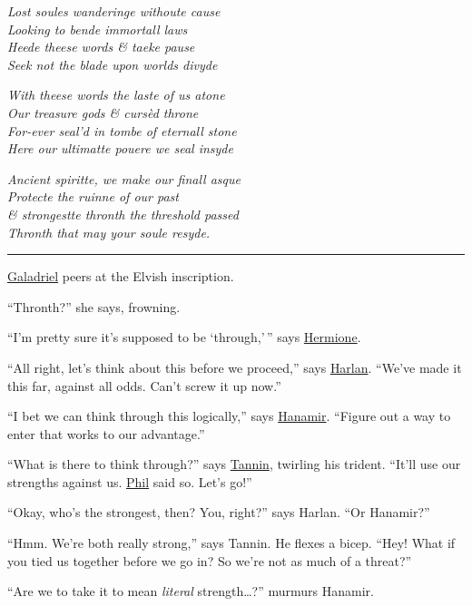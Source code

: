\documentclass[smalldemyvopaper,11pt,twoside,onecolumn,openright,extrafontsizes]{memoir}
\begin{document}
\emph{Lost soules wanderinge withoute cause}\\
\emph{Looking to bende immortall laws}\\
\emph{Heede theese words \& taeke pause}\\
\emph{Seek not the blade upon worlds divyde}

\emph{With theese words the laste of us atone}\\
\emph{Our treasure gods \& cursèd throne}\\
\emph{For-ever seal'd in tombe of eternall stone}\\
\emph{Here our ultimatte pouere we seal insyde}

\emph{Ancient spiritte, we make our finall asque}\\
\emph{Protecte the ruinne of our past}\\
\emph{\& strongestte thronth the threshold passed}\\
\emph{Thronth that may your soule resyde.}

\begin{center}\rule{0.5\linewidth}{\linethickness}\end{center}

\href{/characters/galadriel/}{Galadriel} peers at the Elvish
inscription.

``Thronth?'' she says, frowning.

``I'm pretty sure it's supposed to be `through,'\,'' says
\href{/characters/hermione/}{Hermione}.

``All right, let's think about this before we proceed,'' says
\href{/characters/harlan/}{Harlan}. ``We've made it this far, against
all odds. Can't screw it up now.''

``I bet we can think through this logically,'' says
\href{/characters/hanamir/}{Hanamir}. ``Figure out a way to enter that
works to our advantage.''

``What is there to think through?'' says
\href{/characters/tannin/}{Tannin}, twirling his trident. ``It'll use
our strengths against us. \href{/characters/phil/}{Phil} said so. Let's
go!''

``Okay, who's the strongest, then? You, right?'' says Harlan. ``Or
Hanamir?''

``Hmm. We're both really strong,'' says Tannin. He flexes a bicep.
``Hey! What if you tied us together before we go in? So we're not as
much of a threat?''

``Are we to take it to mean \emph{literal} strength\ldots?'' murmurs
Hanamir.
\end{document}
